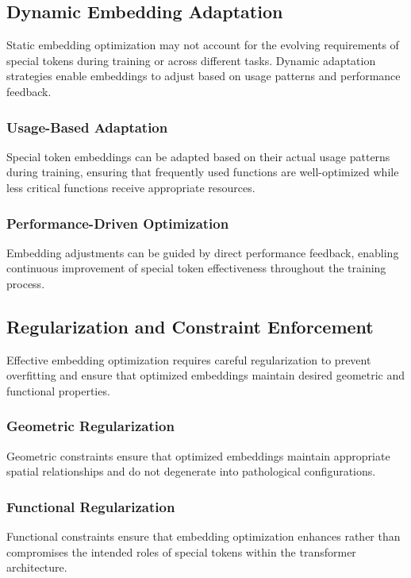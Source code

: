 \subsection{Dynamic Embedding Adaptation}

Static embedding optimization may not account for the evolving requirements of special tokens during training or across different tasks. Dynamic adaptation strategies enable embeddings to adjust based on usage patterns and performance feedback.

\subsubsection{Usage-Based Adaptation}

Special token embeddings can be adapted based on their actual usage patterns during training, ensuring that frequently used functions are well-optimized while less critical functions receive appropriate resources.

\subsubsection{Performance-Driven Optimization}

Embedding adjustments can be guided by direct performance feedback, enabling continuous improvement of special token effectiveness throughout the training process.

\subsection{Regularization and Constraint Enforcement}

Effective embedding optimization requires careful regularization to prevent overfitting and ensure that optimized embeddings maintain desired geometric and functional properties.

\subsubsection{Geometric Regularization}

Geometric constraints ensure that optimized embeddings maintain appropriate spatial relationships and do not degenerate into pathological configurations.

\subsubsection{Functional Regularization}

Functional constraints ensure that embedding optimization enhances rather than compromises the intended roles of special tokens within the transformer architecture.